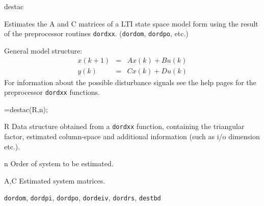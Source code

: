 \documentclass{book}
\newcommand{\destbd}{\texttt{destbd}}
\newcommand{\dordxx}{\texttt{dordxx}}%
\newcommand{\dordom}{\texttt{dordom}}
\newcommand{\dordpo}{\texttt{dordpo}}
\newcommand{\dordpi}{\texttt{dordpi}}
\newcommand{\dordrs}{\texttt{dordrs}}
\newcommand{\dordeiv}{\texttt{dordeiv}}
\begin{document}
\begin{command}{destac}

\begin{purpose}
  Estimates the A and C matrices of a LTI state space model form using
  the result of the preprocessor routines {\dordxx}. ({\dordom},
    {\dordpo}, etc.)

General model structure:
\begin{eqnarray*}
x(k+1) &=&Ax(k) + Bu(k)\\
y(k)   &=&Cx(k) + Du(k)
\end{eqnarray*}  
For information about the possible disturbance signals see the help
pages for the preprocessor {\dordxx} functions.
\end{purpose}

\begin{syntax}
[A,C]=destac(R,n);
\end{syntax}

\begin{inputs}
\item[R] Data structure obtained from a {\dordxx} function, containing the
  triangular factor, estimated column-space and additional information
  (such as i/o dimension etc.).
\item[n] Order of system to be estimated.
\end{inputs}

\begin{outputs}
\item[A,C] Estimated system matrices.
\end{outputs}

\begin{seealso}
 \dordom, \dordpi, \dordpo, \dordeiv, \dordrs, \destbd
\end{seealso}
\end{command}%
\end{document}
